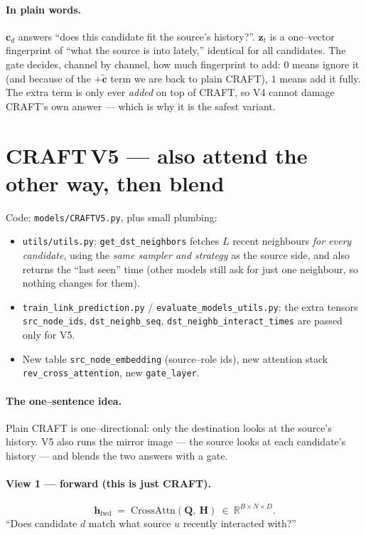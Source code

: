 \documentclass[11pt]{article}
\newcommand{\R}{\mathbb{R}}
\newcommand{\code}[1]{\texttt{\small #1}}
\newcommand{\CA}{\mathrm{CrossAttn}}
\begin{document}
\paragraph{In plain words.}
$\bm{c}_d$ answers ``does this candidate fit the source's history?''. $\bm{z}_t$
is a one--vector fingerprint of ``what the source is into lately,'' identical for
all candidates. The gate decides, channel by channel, how much fingerprint to
add: $0$ means ignore it (and because of the $+\tilde{\bm{c}}$ term we are back
to plain CRAFT), $1$ means add it fully. The extra term is only ever
\emph{added} on top of CRAFT, so V4 cannot damage CRAFT's own answer --- which
is why it is the safest variant.

\section{CRAFT\,V5 --- also attend the other way, then blend}
\label{sec:v5}

Code: \code{models/CRAFTV5.py}, plus small plumbing:
\begin{itemize}[nosep]
  \item \code{utils/utils.py}: \code{get\_dst\_neighbors} fetches $L$ recent
        neighbours \emph{for every candidate}, using the \emph{same sampler and
        strategy} as the source side, and also returns the ``last seen'' time
        (other models still ask for just one neighbour, so nothing changes for
        them).
  \item \code{train\_link\_prediction.py} / \code{evaluate\_models\_utils.py}:
        the extra tensors \code{src\_node\_ids}, \code{dst\_neighb\_seq},
        \code{dst\_neighb\_interact\_times} are passed only for V5.
  \item New table \code{src\_node\_embedding} (source--role ids), new attention
        stack \code{rev\_cross\_attention}, new \code{gate\_layer}.
\end{itemize}

\paragraph{The one--sentence idea.}
Plain CRAFT is one--directional: only the destination looks at the source's
history. V5 also runs the mirror image --- the source looks at each candidate's
history --- and blends the two answers with a gate.

\paragraph{View 1 --- forward (this is just CRAFT).}
\[
  \bm{h}_{\text{fwd}} \;=\; \CA(\bm{Q},\ \bm{H})\ \in\ \R^{B\times N\times D}.
\]
``Does candidate $d$ match what source $u$ recently interacted with?''
\end{document}
